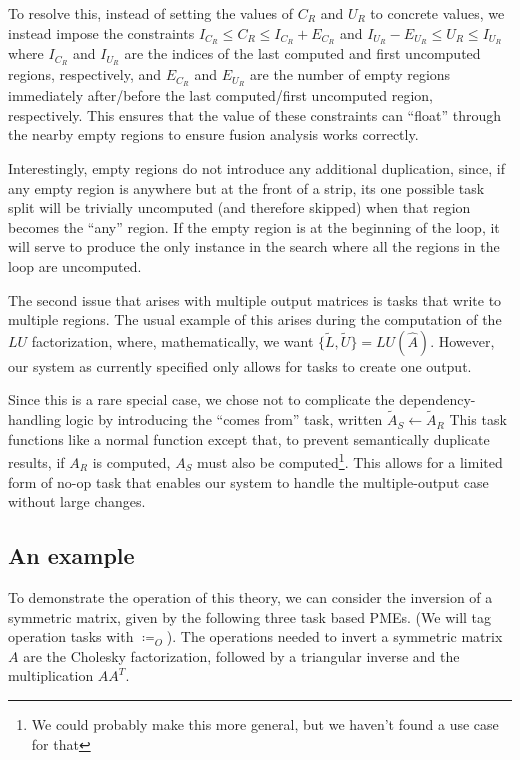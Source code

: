 \documentclass[12pt,letterpaper]{article}
\begin{document}
To resolve this, instead of setting the values of $C_R$ and $U_R$ to concrete values, we instead impose the constraints $I_{C_R} \leq C_R \leq I_{C_R} + E_{C_R}$ and $I_{U_R} - E_{U_R} \leq U_R \leq I_{U_R}$ where $I_{C_R}$ and $I_{U_R}$ are the indices of the last computed and first uncomputed regions, respectively, and $E_{C_R}$ and $E_{U_R}$ are the number of empty regions immediately after/before the last computed/first uncomputed region, respectively.
This ensures that the value of these constraints can ``float'' through the nearby empty regions to ensure fusion analysis works correctly.

Interestingly, empty regions do not introduce any additional duplication, since, if any empty region is anywhere but at the front of a strip, its one possible task split will be trivially uncomputed (and therefore skipped) when that region becomes the ``any'' region.
If the empty region is at the beginning of the loop, it will serve to produce the only instance in the search where all the regions in the loop are uncomputed.

The second issue that arises with multiple output matrices is tasks that write to multiple regions.
The usual example of this arises during the computation of the $LU$ factorization, where, mathematically, we want $\{\widetilde{L}, \widetilde{U}\} = LU(\hat{A})$.
However, our system as currently specified only allows for tasks to create one output.

Since this is a rare special case, we chose not to complicate the dependency-handling logic by introducing the ``comes from'' task, written $\widetilde{A}_S \leftarrow \widetilde{A}_R$
This task functions like a normal function except that, to prevent semantically duplicate results, if $A_R$ is computed, $A_S$ must also be computed\footnote{We could probably make this more general, but we haven't found a use case for that}.
This allows for a limited form of no-op task that enables our system to handle the multiple-output case without large changes.

\subsection{An example}
To demonstrate the operation of this theory, we can consider the inversion of a symmetric matrix, given by the following three task based PMEs. (We will tag operation tasks with $\coloneqq_O$).
The operations needed to invert a symmetric matrix $A$ are the Cholesky factorization, followed by a triangular inverse and the multiplication $AA^{T}$.
\end{document}

